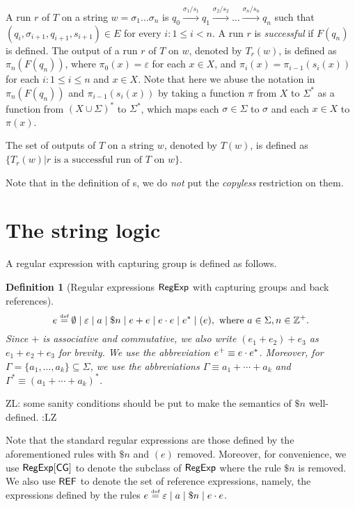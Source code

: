 \documentclass[sigplan,review,anonymous]{acmart}\settopmatter{printfolios=true,printccs=false,printacmref=false}
\newcommand{\zhilin}[1]{\color{brown} {ZL: #1 :LZ} \color{black}}
\newcommand{\zhilin}[1]{}
\newcommand{\tmop}[1]{\ensuremath{\operatorname{#1}}}
\newtheorem{definition}{Definition}
\begin{document}
  A run $r$ of $T$ on a string $w = \sigma_1 \ldots \sigma_n$ is $q_0 \xrightarrow{\sigma_1 / s_1} q_1
  \xrightarrow{\sigma_2 / s_2} \ldots \xrightarrow{\sigma_n / s_n} q_n$ such that
  $(q_i, \sigma_{i + 1}, q_{i + 1}, s_{i + 1}) \in E$ for every $i: 1 \le i < n$. A run $r$ is \emph{successful} if $F(q_n)$ is
  defined. The output of a run $r$ of $T$ on $w$, denoted by $T_r(w)$, is defined as $\pi_n(F(q_n))$, where $\pi_0(x) = \varepsilon$ for each $x \in X$, and $\pi_{i}(x) = \pi_{i-1}(s_{i}(x))$ for each $i: 1 \le i \le n$ and $x \in X$. Note that here we abuse the notation in $\pi_n(F(q_n))$ and $\pi_{i-1}(s_{i}(x))$ by taking a function $\pi$ from $X$ to $\Sigma^*$ as a function from $(X \cup \Sigma)^*$ to $\Sigma^*$, which maps each $\sigma \in \Sigma$ to $\sigma$ and each $x \in X$ to $\pi(x)$.  
  
  
The set of outputs of $T$ on a string $w$, denoted by $T(w)$, is defined as $\{ T_r(w) | r
\mbox{ is a successful run of } T \mbox{ on } w \}$.

Note that in the definition of \NSST{}s, we do \emph{not} put the  \emph{copyless} restriction on them.

\section{The string logic}


A regular expression with capturing group is defined as follows.

\begin{definition}[Regular expressions ${\sf RegExp}$ with capturing groups and back references]
	\[e \eqdef \emptyset \mid \varepsilon \mid a \mid \$n \mid e + e \mid e \concat e \mid e^* \mid (e), \mbox{ where } a \in \Sigma, n \in \Int^+. \]
	Since $+$ is associative and commutative, we also write $(e_1 + e_2) + e_3$ as $e_1 + e_2 + e_3$ for brevity. We use the abbreviation $e^+ \equiv e \cdot e^*$. Moreover, for $\Gamma = \{a_1, \ldots, a_k\}\subseteq \Sigma$, we use the abbreviations $\Gamma \equiv a_1 + \cdots + a_k$ and $\Gamma^\ast \equiv (a_1 + \cdots + a_k)^\ast$. 
\end{definition}
\zhilin{some sanity conditions should be put to make the semantics of $\$ n$ well-defined.}

Note that the standard regular expressions are those defined by the aforementioned rules with $\$ n$ and $(e)$ removed.
Moreover, for convenience, we use ${\sf RegExp}[\sf CG]$ to denote the subclass of ${\sf RegExp}$ where the rule $\$ n$ is removed. We also use ${\sf REF}$ to denote the set of reference expressions, namely, the expressions defined by the rules $e \eqdef \varepsilon \mid a \mid \$n \mid e \concat e$.
\end{document}
